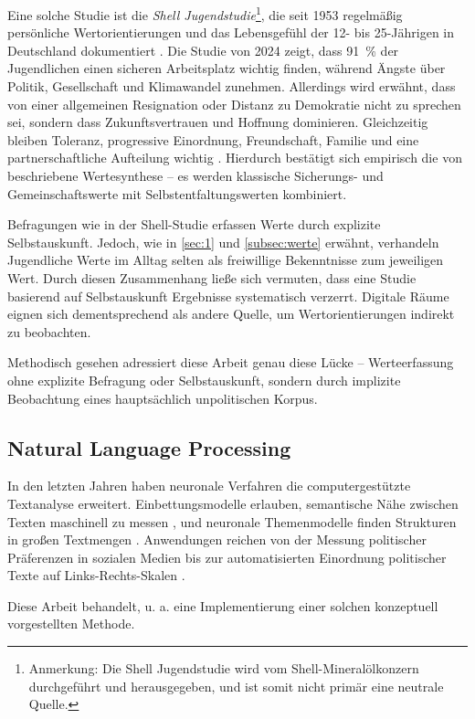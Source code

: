 Eine solche Studie ist die \emph{Shell Jugendstudie}\footnote{Anmerkung: Die Shell Jugendstudie wird vom Shell-Mineralölkonzern durchgeführt und herausgegeben, und ist somit nicht primär eine neutrale Quelle.}, die seit 1953 regelmäßig persönliche Wertorientierungen und das Lebensgefühl der 12- bis 25-Jährigen in Deutschland dokumentiert \autocite{Al24}.
Die Studie von 2024 zeigt, dass 91~\% der Jugendlichen einen sicheren Arbeitsplatz wichtig finden, während Ängste über Politik, Gesellschaft und Klimawandel zunehmen.
Allerdings wird erwähnt, dass von einer allgemeinen Resignation oder Distanz zu Demokratie nicht zu sprechen sei, sondern dass Zukunftsvertrauen und Hoffnung dominieren.
Gleichzeitig bleiben Toleranz, progressive Einordnung, Freundschaft, Familie und eine partnerschaftliche Aufteilung wichtig \autocite{Al24}.
Hierdurch bestätigt sich empirisch die von \textcite{Kl84} beschriebene Wertesynthese -- es werden klassische Sicherungs- und Gemeinschaftswerte mit Selbstentfaltungswerten kombiniert.

Befragungen wie in der Shell-Studie erfassen Werte durch explizite Selbstauskunft.
Jedoch, wie in \autoref{sec:1} und \autoref{subsec:werte} erwähnt, verhandeln Jugendliche Werte im Alltag selten als freiwillige Bekenntnisse zum jeweiligen Wert.
Durch diesen Zusammenhang ließe sich vermuten, dass eine Studie basierend auf Selbstauskunft Ergebnisse systematisch verzerrt.
Digitale Räume eignen sich dementsprechend als andere Quelle, um Wertorientierungen indirekt zu beobachten.

Methodisch gesehen adressiert diese Arbeit genau diese Lücke -- Werteerfassung ohne explizite Befragung oder Selbstauskunft, sondern durch implizite Beobachtung eines hauptsächlich unpolitischen Korpus.

\subsection{Natural Language Processing}
In den letzten Jahren haben neuronale Verfahren die computergestützte Textanalyse erweitert.
Einbettungsmodelle erlauben, semantische Nähe zwischen Texten maschinell zu messen \autocite{RG19}, und neuronale Themenmodelle finden Strukturen in großen Textmengen \autocite{Gro22, Wu24}.
Anwendungen reichen von der Messung politischer Präferenzen in sozialen Medien \autocite{Bie22} bis zur automatisierten Einordnung politischer Texte auf Links-Rechts-Skalen \autocite{Aks21, HS23}.

Diese Arbeit behandelt, u. a. eine Implementierung einer solchen konzeptuell vorgestellten Methode.

